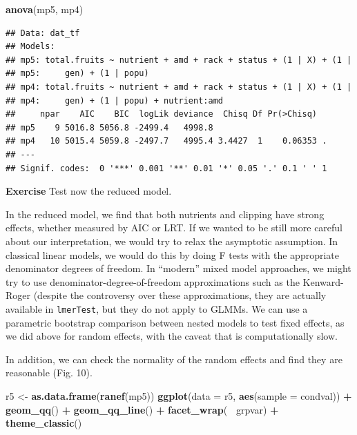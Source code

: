 \documentclass[
  12pt,
]{book}
\newenvironment{Shaded}{\begin{snugshade}}{\end{snugshade}}
\newcommand{\DataTypeTok}[1]{\textcolor[rgb]{0.13,0.29,0.53}{#1}}
\newcommand{\KeywordTok}[1]{\textcolor[rgb]{0.13,0.29,0.53}{\textbf{#1}}}
\newcommand{\NormalTok}[1]{#1}
\newcommand{\OperatorTok}[1]{\textcolor[rgb]{0.81,0.36,0.00}{\textbf{#1}}}
\newcommand{\StringTok}[1]{\textcolor[rgb]{0.31,0.60,0.02}{#1}}
\begin{document}
\begin{Shaded}
\begin{Highlighting}[]
\KeywordTok{anova}\NormalTok{(mp5, mp4)}
\end{Highlighting}
\end{Shaded}

\begin{verbatim}
## Data: dat_tf
## Models:
## mp5: total.fruits ~ nutrient + amd + rack + status + (1 | X) + (1 | 
## mp5:     gen) + (1 | popu)
## mp4: total.fruits ~ nutrient + amd + rack + status + (1 | X) + (1 | 
## mp4:     gen) + (1 | popu) + nutrient:amd
##     npar    AIC    BIC  logLik deviance  Chisq Df Pr(>Chisq)  
## mp5    9 5016.8 5056.8 -2499.4   4998.8                       
## mp4   10 5015.4 5059.8 -2497.7   4995.4 3.4427  1    0.06353 .
## ---
## Signif. codes:  0 '***' 0.001 '**' 0.01 '*' 0.05 '.' 0.1 ' ' 1
\end{verbatim}

\textbf{Exercise}
Test now the reduced model.

In the reduced model, we find that both nutrients and clipping have strong effects, whether measured by AIC or LRT. If we wanted to be still more careful about our interpretation, we would try to relax the asymptotic assumption. In classical linear models, we would do this by doing F tests with the appropriate denominator degrees of freedom. In ``modern'' mixed model approaches, we might try to use denominator-degree-of-freedom approximations such as the Kenward-Roger (despite the controversy over these approximations, they are actually available in \texttt{lmerTest}, but they do not apply to GLMMs. We can use a parametric bootstrap comparison between nested models to test fixed effects, as we did above for random effects, with the caveat that is computationally slow.

In addition, we can check the normality of the random effects and find they are reasonable (Fig. 10).

\begin{Shaded}
\begin{Highlighting}[]
\NormalTok{r5 <-}\StringTok{ }\KeywordTok{as.data.frame}\NormalTok{(}\KeywordTok{ranef}\NormalTok{(mp5))}
\KeywordTok{ggplot}\NormalTok{(}\DataTypeTok{data =}\NormalTok{ r5, }\KeywordTok{aes}\NormalTok{(}\DataTypeTok{sample =}\NormalTok{ condval)) }\OperatorTok{+}
\StringTok{  }\KeywordTok{geom_qq}\NormalTok{() }\OperatorTok{+}\StringTok{ }\KeywordTok{geom_qq_line}\NormalTok{() }\OperatorTok{+}
\StringTok{  }\KeywordTok{facet_wrap}\NormalTok{(}\OperatorTok{~}\StringTok{ }\NormalTok{grpvar) }\OperatorTok{+}
\StringTok{  }\KeywordTok{theme_classic}\NormalTok{()}
\end{Highlighting}
\end{Shaded}
\end{document}
